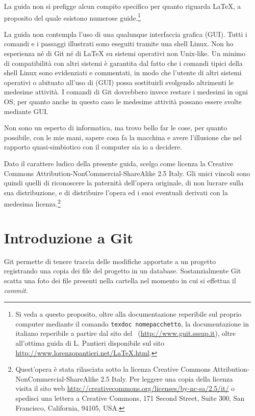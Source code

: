 \documentclass[a4paper,12pt,oneside]{article}
\begin{document}
La guida non si prefigge alcun compito specifico per quanto riguarda \LaTeX, a
proposito del quale esistono numerose guide.\footnote{Si veda a questo proposito,
  oltre alla documentazione reperibile sul proprio computer mediante il comando
  \lstinline|texdoc nomepacchetto|, la documentazione in italiano reperibile a
  partire dal sito del \guit\ (\url{http://www.guit.sssup.it}), oltre all'ottima guida
  di L. Pantieri disponibile sul sito
  \url{http://www.lorenzopantieri.net/LaTeX.html}.}

La guida non contempla l'uso di una qualunque interfaccia grafica (GUI). Tutti i
comandi e i passaggi illustrati sono eseguiti tramite una shell Linux.
Non ho esperienza né di Git né di \LaTeX{} su sistemi operativi non
Unix-like. Un minimo di compatibilità con altri sistemi è garantita dal fatto
che i comandi tipici della shell Linux sono evidenziati e commentati, in modo
che l'utente di altri sistemi operativi o abituato all'uso di (GUI) possa
sostituirli svolgendo altrimenti le medesime attività. I comandi di
Git dovrebbero invece restare i medesimi in ogni OS, per quanto anche in questo
caso le medesime attività possano essere svolte mediante GUI.

Non sono un esperto di informatica, ma trovo bello far le cose, per quanto
possibile, con le mie mani, sapere cosa fa la macchina e avere l'illusione che
nel rapporto quasi-simbiotico con il computer sia io a decidere.

Dato il carattere ludico della presente guida, scelgo come licenza la Creative
Commons Attribution-NonCommercial-ShareAlike 2.5 Italy. Gli unici vincoli sono
quindi quelli di riconoscere la paternità dell'opera
originale, di non lucrare sulla sua distribuzione, e di distribuire l'opera ed
i suoi eventuali derivati con la medesima licenza.\footnote{
  Quest'opera è stata rilasciata sotto la licenza
  Creative Commons Attribution-NonCommercial-ShareAlike 2.5 Italy.
  Per leggere una copia della licenza visita il sito web
  \url{http://creativecommons.org/licenses/by-nc-sa/2.5/it/}
  o spedisci una lettera a Creative Commons, 171 Second Street, Suite 300, San
  Francisco, California, 94105, USA.}

\section{Introduzione a Git}
Git permette di tenere traccia delle modifiche apportate a un progetto registrando
una copia dei file del progetto in un database. Sostanzialmente Git scatta una
foto dei file presenti nella cartella nel momento in cui si effettua il
\emph{commit}.
\end{document}
